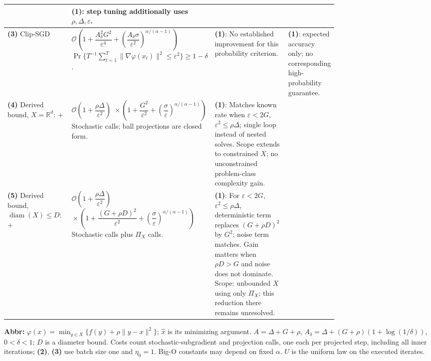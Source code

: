 \begin{table}[tp]
\begin{threeparttable}
\begin{tabularx}{\linewidth}{@{}>{\raggedright\arraybackslash}p{0.20\linewidth}>{\raggedright\arraybackslash}p{0.32\linewidth}>{\raggedright\arraybackslash}p{0.25\linewidth}>{\raggedright\arraybackslash}X@{}}
& \textbf{(1)}: step tuning additionally uses $\rho,\Delta,\varepsilon$. \\
\midrule
\textbf{(3)} Clip-SGD \citep[Thm.~3, v1]{wchtZhu2025v1}
& $\mathcal{O}\!\left(1+\dfrac{A_\delta^2G^2}{\varepsilon^4}+\left(\dfrac{A_\delta\sigma}{\varepsilon^2}\right)^{\!\alpha/(\alpha-1)}\right)$\newline
$\Pr\{T^{-1}\sum_{t=1}^T\|\nabla\varphi(x_t)\|^2\le\varepsilon^2\}\ge1-\delta$.
& \textbf{(1)}: No established improvement for this probability criterion.
& \textbf{(1)}: expected accuracy only; no corresponding high-probability guarantee. \\
\midrule
\textbf{(4)} Derived bound, $X=\mathbb{R}^d$: \citep[Sec.~3]{wchtDavisGrimmer2019} + \citep[Thm.~9, v3]{wchtLiuZhou2023v3}
& $\mathcal{O}\!\left(1+\dfrac{\rho\Delta}{\varepsilon^2}\right)$\newline
$\displaystyle{}\times\left(1+\dfrac{G^2}{\varepsilon^2}+\left(\dfrac{\sigma}{\varepsilon}\right)^{\!\alpha/(\alpha-1)}\right)$\newline
Stochastic calls; ball projections are closed form.
& \textbf{(1)}: Matches known rate when $\varepsilon<2G$, $\varepsilon^2\le\rho\Delta$; single loop instead of nested solves. Scope extends to constrained $X$; no unconstrained problem-class complexity gain.
& \\
\midrule
\textbf{(5)} Derived bound, $\operatorname{diam}(X)\le D$: \citep[Sec.~3]{wchtDavisGrimmer2019} + \citep[Thm.~9, v3]{wchtLiuZhou2023v3}
& $\mathcal{O}\!\left(1+\dfrac{\rho\Delta}{\varepsilon^2}\right)$\newline
$\displaystyle{}\times\left(1+\dfrac{(G+\rho D)^2}{\varepsilon^2}+\left(\dfrac{\sigma}{\varepsilon}\right)^{\!\alpha/(\alpha-1)}\right)$\newline
Stochastic calls plus $\Pi_X$ calls.
& \textbf{(1)}: For $\varepsilon<2G$, $\varepsilon^2\le\rho\Delta$, deterministic term replaces $(G+\rho D)^2$ by $G^2$; noise term matches. Gain matters when $\rho D>G$ and noise does not dominate. Scope: unbounded $X$ using only $\Pi_X$; this reduction there remains unresolved.
& \\
\bottomrule
\end{tabularx}
\begin{tablenotes}[flushleft]\footnotesize
\item[] \textbf{Abbr:} $\varphi(x)=\min_{y\in X}\{f(y)+\rho\|y-x\|^2\}$; $\hat x$ is its minimizing argument. $A=\Delta+G+\rho$, $A_\delta=\Delta+(G+\rho)(1+\log(1/\delta))$, $0<\delta<1$; $D$ is a diameter bound. Costs count stochastic-subgradient and projection calls, one each per projected step, including all inner iterations; \textbf{(2)}, \textbf{(3)} use batch size one and $\eta_0=1$. Big-O constants may depend on fixed $\alpha$. $U$ is the uniform law on the executed iterates.
\end{tablenotes}
\end{threeparttable}
\end{table}
\clearpage
